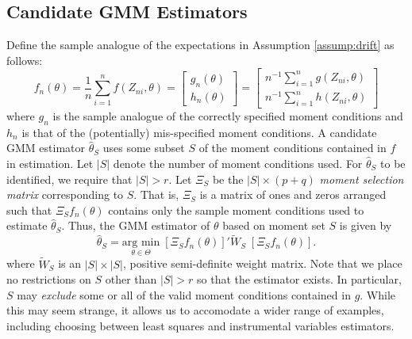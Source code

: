 \documentclass[12pt]{article}
\theoremstyle{definition}
\begin{document}
\subsection{Candidate GMM Estimators}
Define the sample analogue of the expectations in Assumption \ref{assump:drift} as follows:
$$f_n(\theta) = \frac{1}{n}\sum_{i=1}^n f(Z_{ni},\theta) = \left[\begin{array}{c} g_n(\theta)\\ h_n(\theta) \end{array} \right]=\left[\begin{array}{c}n^{-1}\sum_{i=1}^n g(Z_{ni},\theta) \\ n^{-1}\sum_{i=1}^n h(Z_{ni},\theta) \end{array}\right]$$
where $g_n$ is the sample analogue of the correctly specified moment conditions and $h_n$ is that of the (potentially) mis-specified moment conditions.
A candidate GMM estimator $\widehat{\theta}_S$ uses some subset $S$ of the moment conditions contained in $f$ in estimation. 
Let $|S|$ denote the number of moment conditions used. For $\widehat{\theta}_S$ to be identified, we require that $|S|>r$. 
Let $\Xi_S$ be the $|S| \times(p +q)$ \emph{moment selection matrix} corresponding to $S$. That is, $\Xi_S$ is a matrix of ones and zeros arranged such that $\Xi_S f_n(\theta)$ contains only the sample moment conditions used to estimate $\widehat{\theta}_S$. 
Thus, the GMM estimator of $\theta$ based on moment set $S$ is given by 
$$\widehat{\theta}_S = \underset{\theta \in \Theta}{\mbox{arg min}}\; \left[\Xi_S f_n(\theta)\right]' \widetilde{W}_S \; \left[ \Xi_S f_n(\theta)\right].$$
where $\widetilde{W}_S$ is an $|S|\times |S|$, positive semi-definite weight matrix. Note that we place no restrictions on $S$ other than $|S| >r$ so that the estimator exists. 
In particular, $S$ may \emph{exclude} some or all of the valid moment conditions contained in $g$.
While this may seem strange, it allows us to accomodate a wider range of examples, including choosing between least squares and instrumental variables estimators.
\end{document}
